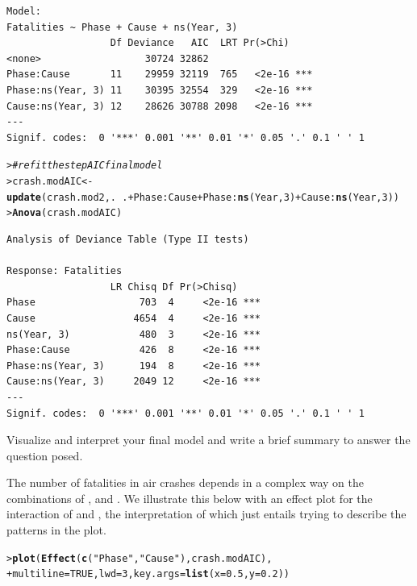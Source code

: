 \documentclass[10pt]{report}\usepackage[]{graphicx}\usepackage[]{color}
\makeatletter
\newcommand{\hlnum}[1]{\textcolor[rgb]{0.686,0.059,0.569}{#1}}%
\newcommand{\hlstr}[1]{\textcolor[rgb]{0.192,0.494,0.8}{#1}}%
\newcommand{\hlcom}[1]{\textcolor[rgb]{0.678,0.584,0.686}{\textit{#1}}}%
\newcommand{\hlopt}[1]{\textcolor[rgb]{0,0,0}{#1}}%
\newcommand{\hlstd}[1]{\textcolor[rgb]{0.345,0.345,0.345}{#1}}%
\newcommand{\hlkwb}[1]{\textcolor[rgb]{0.69,0.353,0.396}{#1}}%
\newcommand{\hlkwc}[1]{\textcolor[rgb]{0.333,0.667,0.333}{#1}}%
\newcommand{\hlkwd}[1]{\textcolor[rgb]{0.737,0.353,0.396}{\textbf{#1}}}%
\newenvironment{kframe}{%
 \def\at@end@of@kframe{}%
 \ifinner\ifhmode%
  \def\at@end@of@kframe{\end{minipage}}%
  \begin{minipage}{\columnwidth}%
 \fi\fi%
 \def\FrameCommand##1{\hskip\@totalleftmargin \hskip-\fboxsep
 \colorbox{shadecolor}{##1}\hskip-\fboxsep
     \hskip-\linewidth \hskip-\@totalleftmargin \hskip\columnwidth}%
 \MakeFramed {\advance\hsize-\width
   \@totalleftmargin\z@ \linewidth\hsize
   \@setminipage}}%
 {\par\unskip\endMakeFramed%
 \at@end@of@kframe}
\newenvironment{knitrout}{}{} %
\renewenvironment{knitrout}{\small\renewcommand{\baselinestretch}{.85}}{} %
\makeatother
\begin{document}
\begin{Exercises}
\begin{enumerate*}
\begin{ans}
\begin{knitrout}
\begin{kframe}
\begin{verbatim}
Model:
Fatalities ~ Phase + Cause + ns(Year, 3)
                  Df Deviance   AIC  LRT Pr(>Chi)    
<none>                  30724 32862                  
Phase:Cause       11    29959 32119  765   <2e-16 ***
Phase:ns(Year, 3) 11    30395 32554  329   <2e-16 ***
Cause:ns(Year, 3) 12    28626 30788 2098   <2e-16 ***
---
Signif. codes:  0 '***' 0.001 '**' 0.01 '*' 0.05 '.' 0.1 ' ' 1
\end{verbatim}
\begin{alltt}
\hlstd{> }\hlcom{# refit the stepAIC final model}
\hlstd{> }\hlstd{crash.modAIC} \hlkwb{<-} \hlkwd{update}\hlstd{(crash.mod2, .}\hlopt{~}\hlstd{.} \hlopt{+} \hlstd{Phase}\hlopt{:}\hlstd{Cause} \hlopt{+} \hlstd{Phase}\hlopt{:}\hlkwd{ns}\hlstd{(Year,} \hlnum{3}\hlstd{)} \hlopt{+} \hlstd{Cause}\hlopt{:}\hlkwd{ns}\hlstd{(Year,} \hlnum{3}\hlstd{))}
\hlstd{> }\hlkwd{Anova}\hlstd{(crash.modAIC)}
\end{alltt}
\begin{verbatim}
Analysis of Deviance Table (Type II tests)

Response: Fatalities
                  LR Chisq Df Pr(>Chisq)    
Phase                  703  4     <2e-16 ***
Cause                 4654  4     <2e-16 ***
ns(Year, 3)            480  3     <2e-16 ***
Phase:Cause            426  8     <2e-16 ***
Phase:ns(Year, 3)      194  8     <2e-16 ***
Cause:ns(Year, 3)     2049 12     <2e-16 ***
---
Signif. codes:  0 '***' 0.001 '**' 0.01 '*' 0.05 '.' 0.1 ' ' 1
\end{verbatim}
\end{kframe}
\end{knitrout}
    \end{ans}
    
    \item Visualize and interpret your final model and write a brief summary to answer the 
    question posed.
    \begin{ans}
    The number of fatalities in air crashes depends in a complex way on the combinations of
    ,  and .  We illustrate this below with an effect plot
    for the interaction of  and , the interpretation of which just
    entails trying to describe the patterns in the plot.  
\begin{knitrout}\footnotesize
{}\color{fgcolor}\begin{kframe}
\begin{alltt}
\hlstd{> }\hlkwd{plot}\hlstd{(}\hlkwd{Effect}\hlstd{(}\hlkwd{c}\hlstd{(}\hlstr{"Phase"}\hlstd{,} \hlstr{"Cause"}\hlstd{), crash.modAIC),}
\hlstd{+ }     \hlkwc{multiline}\hlstd{=}\hlnum{TRUE}\hlstd{,} \hlkwc{lwd}\hlstd{=}\hlnum{3}\hlstd{,} \hlkwc{key.args}\hlstd{=}\hlkwd{list}\hlstd{(}\hlkwc{x}\hlstd{=}\hlnum{0.5}\hlstd{,} \hlkwc{y}\hlstd{=}\hlnum{0.2}\hlstd{))}
\end{alltt}
\end{kframe}


\end{knitrout}
\end{ans}
\end{enumerate*}
\end{Exercises}
\end{document}
